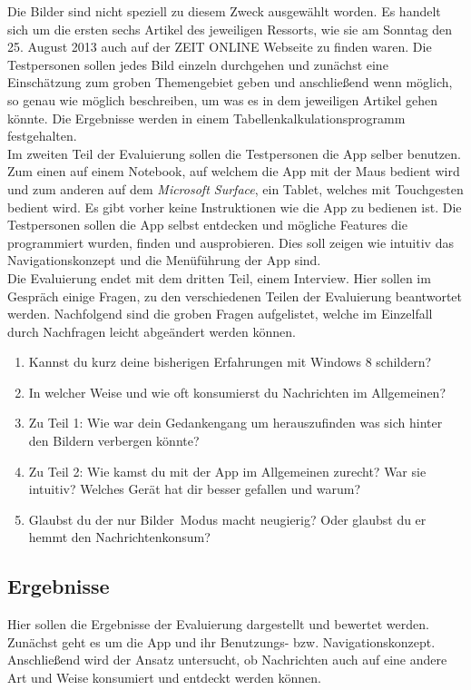 \documentclass[12pt,a4paper,bibtotoc,abstracton]{scrartcl}
\begin{document}
Die Bilder sind nicht speziell zu diesem Zweck ausgewählt worden. Es handelt sich um die ersten sechs Artikel des jeweiligen Ressorts, wie sie am Sonntag den 25. August 2013 auch auf der ZEIT ONLINE Webseite zu finden waren. Die Testpersonen sollen jedes Bild einzeln durchgehen und zunächst eine Einschätzung zum groben Themengebiet geben und anschließend wenn möglich, so genau wie möglich beschreiben, um was es in dem jeweiligen Artikel gehen könnte. Die Ergebnisse werden in einem Tabellenkalkulationsprogramm festgehalten.\\

Im zweiten Teil der Evaluierung sollen die Testpersonen die App selber benutzen. Zum einen auf einem Notebook, auf welchem die App mit der Maus bedient wird und zum anderen auf dem \textit{Microsoft Surface}, ein Tablet, welches mit Touchgesten bedient wird. Es gibt vorher keine Instruktionen wie die App zu bedienen ist. Die Testpersonen sollen die App selbst entdecken und mögliche Features die programmiert wurden, finden und ausprobieren. Dies soll zeigen wie intuitiv das Navigationskonzept und die Menüführung der App sind.\\

Die Evaluierung endet mit dem dritten Teil, einem Interview. Hier sollen im Gespräch einige Fragen, zu den verschiedenen Teilen der Evaluierung beantwortet werden. Nachfolgend sind die groben Fragen aufgelistet, welche im Einzelfall durch Nachfragen leicht abgeändert werden können.

\begin{enumerate}
	\item Kannst du kurz deine bisherigen Erfahrungen mit Windows 8 schildern?
	\item In welcher Weise und wie oft konsumierst du Nachrichten im Allgemeinen? 
	\item Zu Teil 1: Wie war dein Gedankengang um herauszufinden was sich hinter den Bildern verbergen könnte?
	\item Zu Teil 2: Wie kamst du mit der App im Allgemeinen zurecht? War sie intuitiv? Welches Gerät hat dir besser gefallen und warum?
	\item Glaubst du der \glqq nur Bilder\grqq\ Modus macht neugierig? Oder glaubst du er hemmt den Nachrichtenkonsum? 
\end{enumerate}




\subsection{Ergebnisse}
\label{subsec:ergebnisse}
Hier sollen die Ergebnisse der Evaluierung dargestellt und bewertet werden. Zunächst geht es um die App und ihr Benutzungs- bzw. Navigationskonzept. Anschließend wird der Ansatz untersucht, ob Nachrichten auch auf eine andere Art und Weise konsumiert und entdeckt werden können.
\end{document}
